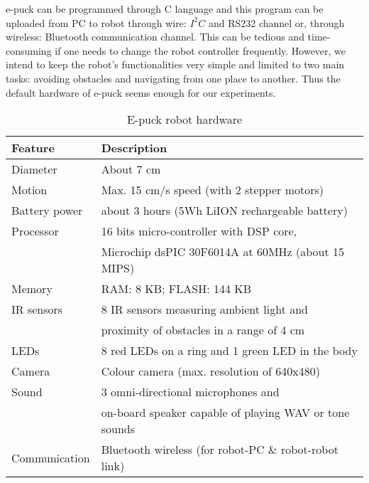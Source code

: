 e-puck can be programmed through C language and this program can be uploaded from PC to robot through wire: $I^{2}C$ and RS232 channel or, through  wireless: Bluetooth communication channel. This can be tedious and time-consuming if one needs to change the robot controller frequently. However, we intend to keep the robot's functionalities very simple and limited to two main tasks: avoiding obstacles and navigating from one place to another. Thus the default hardware of e-puck seems enough for our experiments.
\begin{table}
\caption{E-puck robot hardware}
\label{table:epuck}
\begin{center}
\begin{tabular}{|l|l|}
\hline \textbf{Feature} & \textbf{Description}\\
\hline Diameter & About 7 cm\\
\hline Motion & Max. 15 cm/s speed (with 2 stepper motors)\\
\hline Battery power & about 3 hours (5Wh LiION rechargeable battery)\\
\hline Processor & 16 bits micro-controller with DSP core,\\ & Microchip dsPIC 30F6014A at 60MHz (about 15 MIPS)\\
\hline Memory & RAM: 8 KB; FLASH: 144 KB \\
\hline IR sensors & 8 IR sensors measuring ambient light and \\ & proximity of obstacles in a range of 4 cm\\
\hline LEDs & 8 red LEDs on a ring and 1 green LED in the body \\
\hline Camera & Colour camera (max. resolution of 640x480) \\
\hline Sound & 3 omni-directional microphones and\\ & on-board speaker capable of playing WAV or tone sounds\\
\hline Communication & Bluetooth wireless (for robot-PC \& robot-robot link)\\
\hline
\end{tabular}
\end{center}
\end{table}

